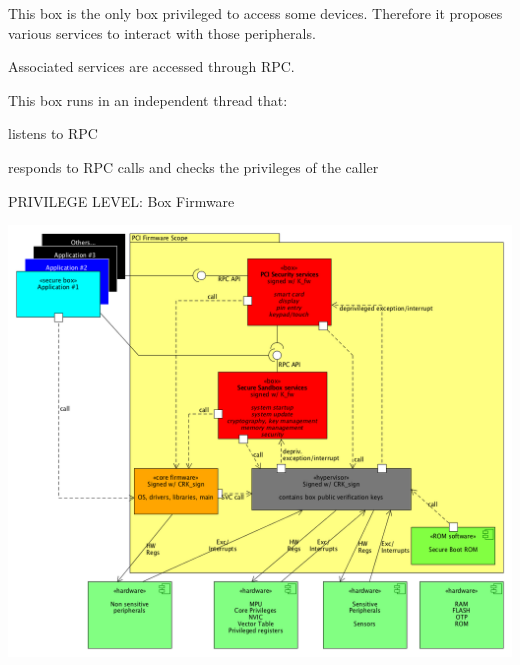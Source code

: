 This box is the only box privileged to access some devices. Therefore it proposes various services to interact with those peripherals.

Associated services are accessed through R\+PC.

This box runs in an independent thread that\+:
\begin{DoxyItemize}
\item listens to R\+PC
\item responds to R\+PC calls and checks the privileges of the caller
\end{DoxyItemize}

P\+R\+I\+V\+I\+L\+E\+GE L\+E\+V\+EL\+: Box Firmware


\begin{DoxyImageNoCaption}
  \mbox{\includegraphics[width=\textwidth, height=\textheight/2, keepaspectratio=true]{pci_cortex.png}}
\end{DoxyImageNoCaption}
  
